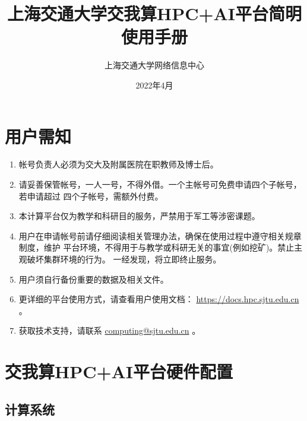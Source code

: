 \documentclass[cn, 12pt, hang, black, chinese]{elegantbook}
\title{上海交通大学交我算HPC+AI平台简明使用手册}
\author{上海交通大学网络信息中心}
\institute{计算业务部}
\date{2022年4月}
\begin{document}
\maketitle
\frontmatter

\chapter*{用户需知}


\begin{enumerate}
\item 帐号负责人必须为交大及附属医院在职教师及博士后。
\item 请妥善保管帐号，一人一号，不得外借。一个主帐号可免费申请四个子帐号，若申请超过 四个子帐号，需额外付费。
\item 本计算平台仅为教学和科研目的服务，严禁用于军工等涉密课题。
\item 用户在申请帐号前请仔细阅读相关管理办法，确保在使用过程中遵守相关规章制度，维护 平台环境，不得用于与教学或科研无关的事宜(例如挖矿)。禁止主观破坏集群环境的行为。 一经发现，将立即终止服务。
\item 用户须自行备份重要的数据及相关文件。
\item 更详细的平台使用方式，请查看用户使用文档： \href{https://docs.hpc.sjtu.edu.cn}{https://docs.hpc.sjtu.edu.cn} 。
\item 获取技术支持，请联系 \href{mailto:computing@sjtu.edu.cn}{computing@sjtu.edu.cn} 。
\end{enumerate}

\tableofcontents

\mainmatter

\chapter{交我算HPC+AI平台硬件配置}

\section{计算系统}
\end{document}
